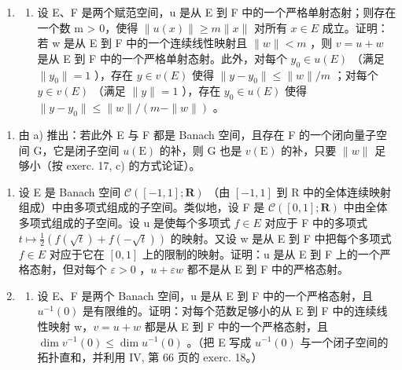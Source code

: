\begin{enumerate}
\def\labelenumi{\arabic{enumi})}
\setcounter{enumi}{17}
\tightlist
\item
  \begin{enumerate}
  \def\labelenumii{\alph{enumii})}
  \tightlist
  \item
    设 E、F 是两个赋范空间，u 是从 E 到 F 中的一个严格单射态射；则存在一个数 m > 0，使得 \(\|u(x)\| \geqslant m \|x\|\) 对所有 \(x \in E\) 成立。证明：若 w 是从 E 到 F 中的一个连续线性映射且 \(\|w\| < m\) ，则 \(v = u + w\) 是从 E 到 F 中的一个严格单射态射。此外，对每个 \(y_0 \in u(E)\) （满足 \(\|y_0\| = 1\) ），存在 \(y \in v(E)\) 使得 \(\|y - y_0\| \leqslant \|w\| / m\) ；对每个 \(y \in v(E)\) （满足 \(\|y\| = 1\) ），存在 \(y_0 \in u(E)\) 使得 \(\|y - y_0\| \leqslant \|w\| / (m - \|w\|)\) 。
  \end{enumerate}
\end{enumerate}

\begin{enumerate}
\def\labelenumi{\alph{enumi})}
\setcounter{enumi}{1}
\tightlist
\item
  由 a) 推出：若此外 E 与 F 都是 Banach 空间，且存在 F 的一个闭向量子空间 G，它是闭子空间 \(u(\mathrm{E})\) 的补，则 G 也是 \(v(\mathrm{E})\) 的补，只要 \(\|w\|\) 足够小（按 exerc. 17, c) 的方式论证）。
\end{enumerate}

\begin{enumerate}
\def\labelenumi{\arabic{enumi})}
\setcounter{enumi}{18}
\item
  设 E 是 Banach 空间 \(\mathcal{C}(\left[-1,1\right];\mathbf{R})\) （由 \([-1,1]\) 到 R 中的全体连续映射组成）中由多项式组成的子空间。类似地，设 F 是 \(\mathcal{C}(\left[0,1\right];\mathbf{R})\) 中由全体多项式组成的子空间。设 u 是使每个多项式 \(f\in E\) 对应于 F 中的多项式 \(t\mapsto\frac{1}{2}(f(\sqrt{t})+f(-\sqrt{t}))\) 的映射。又设 w 是从 E 到 F 中把每个多项式 \(f\in E\) 对应于它在 \([0,1]\) 上的限制的映射。证明：u 是从 E 到 F 上的一个严格态射，但对每个 \(\varepsilon>0\) ，\(u+\varepsilon w\) 都不是从 E 到 F 中的严格态射。
\item
  \begin{enumerate}
  \def\labelenumii{\alph{enumii})}
  \tightlist
  \item
    设 E、F 是两个 Banach 空间，u 是从 E 到 F 中的一个严格态射，且 \(u^{-1}(0)\) 是有限维的。证明：对每个范数足够小的从 E 到 F 中的连续线性映射 w，\(v = u + w\) 都是从 E 到 F 中的一个严格态射，且 \(\dim v^{-1}(0) \leqslant \dim u^{-1}(0)\) 。（把 E 写成 \(u^{-1}(0)\) 与一个闭子空间的拓扑直和，并利用 IV, 第 66 页的 exerc. 18。）
  \end{enumerate}
\end{enumerate}

